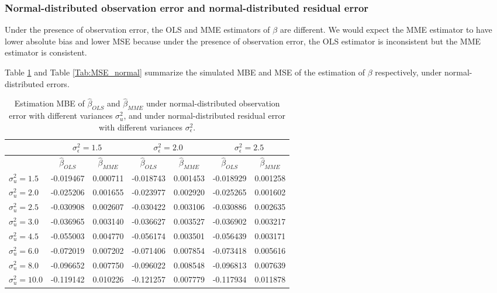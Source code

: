 \documentclass{article}
\begin{document}
\subsubsection{Normal-distributed observation error and normal-distributed residual error}

Under the presence of observation error, the OLS and MME estimators of $\beta$ are different.
We would expect the MME estimator to have lower absolute bias and lower MSE because under the presence of observation error, the OLS estimator is inconsistent but the MME estimator is consistent.

Table \ref{Tab:MBE_normal} and Table \ref{Tab:MSE_normal} summarize the simulated MBE and MSE of the estimation of $\beta$ respectively, under normal-distributed errors.

\begin{table}[ht]
    \centering
    \caption{Estimation MBE of $\hat{\beta}_{OLS}$ and $\hat{\beta}_{MME}$ under normal-distributed observation error with different variances $\sigma^2_u$, and under normal-distributed residual error with different variances $\sigma^2_\epsilon$.}
    \label{Tab:MBE_normal}
    \begin{tabular}[t]{lcccccc}
        \hline
        &\multicolumn{2}{c}{$\sigma^2_\epsilon=1.5$}&\multicolumn{2}{c}{$\sigma^2_\epsilon=2.0$}&\multicolumn{2}{c}{$\sigma^2_\epsilon=2.5$}\\
        \hline
        &$\hat{\beta}_{OLS}$&$\hat{\beta}_{MME}$&$\hat{\beta}_{OLS}$&$\hat{\beta}_{MME}$&$\hat{\beta}_{OLS}$&$\hat{\beta}_{MME}$\\
        \hline
        $\sigma^2_u = 1.5$&-0.019467&0.000711&-0.018743&0.001453&-0.018929&0.001258\\
        $\sigma^2_u = 2.0$&-0.025206&0.001655&-0.023977&0.002920&-0.025265&0.001602\\
        $\sigma^2_u = 2.5$&-0.030908&0.002607&-0.030422&0.003106&-0.030886&0.002635\\
        $\sigma^2_u = 3.0$&-0.036965&0.003140&-0.036627&0.003527&-0.036902&0.003217\\
        $\sigma^2_u = 4.5$&-0.055003&0.004770&-0.056174&0.003501&-0.056439&0.003171\\
        $\sigma^2_u = 6.0$&-0.072019&0.007202&-0.071406&0.007854&-0.073418&0.005616\\
        $\sigma^2_u = 8.0$&-0.096652&0.007750&-0.096022&0.008548&-0.096813&0.007639\\
        $\sigma^2_u = 10.0$&-0.119142&0.010226&-0.121257&0.007779&-0.117934&0.011878\\
        \hline
    \end{tabular}
\end{table}
\end{document}
